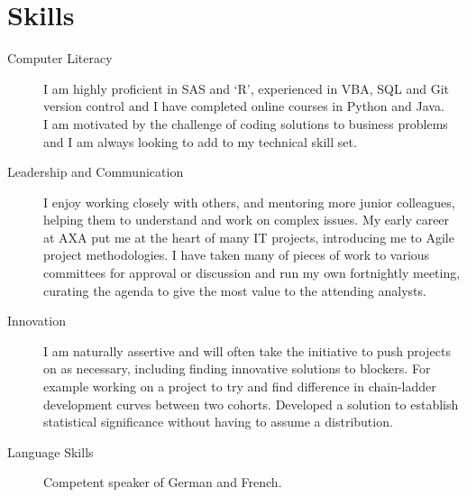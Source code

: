 \documentclass[12pt]{article}
\begin{document}
\section*{Skills}
\begin{description}

\item[Computer Literacy] I am highly proficient in SAS and `R', experienced in VBA, SQL and Git version control and I have completed online courses in Python and Java. \\
I am motivated by the challenge of coding solutions to business problems and I am always looking to add to my technical skill set. %

\item[Leadership and Communication] I enjoy working closely with others, and mentoring more junior colleagues, helping them to understand and work on complex issues. My early career at AXA put me at the heart of many IT projects, introducing me to Agile project methodologies. I have taken many of pieces of work to various committees for approval or discussion and run my own fortnightly meeting, curating the agenda to give the most value to the attending analysts.

\item[Innovation] I am naturally assertive and will often take the initiative to push projects on as necessary, including finding innovative solutions to blockers. For example working on a project to try and find difference in chain-ladder development curves between two cohorts. Developed a solution to establish statistical significance without having to assume a distribution.

\item[Language Skills] Competent speaker of German and French.



\end{description} 
\end{document}
